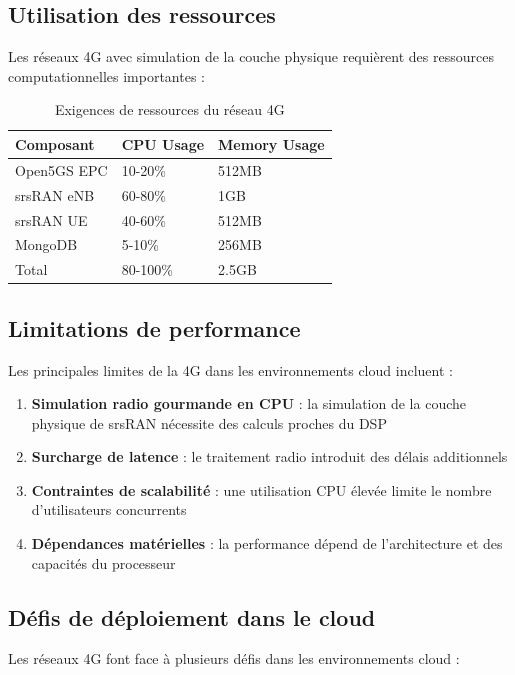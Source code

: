\documentclass[12pt,a4paper]{report}
\begin{document}
\subsection{Utilisation des ressources}

Les réseaux 4G avec simulation de la couche physique requièrent des ressources computationnelles importantes :

\begin{table}[H]
\centering
\caption{Exigences de ressources du réseau 4G}
\label{tab:4g-resources}
\begin{tabular}{@{}lll@{}}
\toprule
Composant & CPU Usage & Memory Usage \\
\midrule
Open5GS EPC & 10-20\% & 512MB \\
srsRAN eNB & 60-80\% & 1GB \\
srsRAN UE & 40-60\% & 512MB \\
MongoDB & 5-10\% & 256MB \\
Total & 80-100\% & 2.5GB \\
\bottomrule
\end{tabular}
\end{table}

\subsection{Limitations de performance}

Les principales limites de la 4G dans les environnements cloud incluent :

\begin{enumerate}
    \item \textbf{Simulation radio gourmande en CPU} : la simulation de la couche physique de srsRAN nécessite des calculs proches du DSP
    \item \textbf{Surcharge de latence} : le traitement radio introduit des délais additionnels
    \item \textbf{Contraintes de scalabilité} : une utilisation CPU élevée limite le nombre d'utilisateurs concurrents
    \item \textbf{Dépendances matérielles} : la performance dépend de l'architecture et des capacités du processeur
\end{enumerate}

\subsection{Défis de déploiement dans le cloud}

Les réseaux 4G font face à plusieurs défis dans les environnements cloud :
\end{document}
